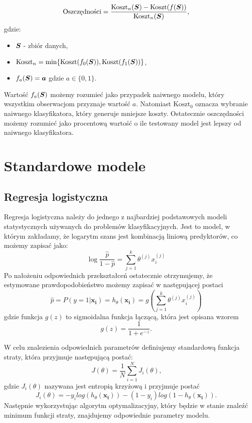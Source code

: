 \documentclass[inzynierska]{pwr_wmat_praca_dyplomowa}
\theoremstyle{plain}
\numberwithin{theorem}{chapter}
\theoremstyle{definition}
\numberwithin{theorem}{chapter}
\begin{document}
\begin{equation}
\text{Oszczędności} = \frac{\text{Koszt}_{n}(\boldsymbol{S}) - \text{Koszt}(f(\boldsymbol{S}))}{\text{Koszt}_{n}(\boldsymbol{S})} \text{,}
\end{equation}
gdzie:
\begin{itemize}
	\item $ \boldsymbol{S} $ - zbiór danych,
	\item $ \text{Koszt}_n = \min\{\text{Koszt}(f_{0}(\boldsymbol{S})), \text{Koszt}(f_{1}(\boldsymbol{S}))\} $,
	\item $ f_{a}(\boldsymbol{S}) = \boldsymbol{a} $ gdzie $a \in \{0,1\}$.
\end{itemize}{}
Wartość $ f_{a}(\boldsymbol{S})$ możemy rozumieć jako przypadek naiwnego modelu, który wszystkim obserwacjom przyznaje wartość $a$. Natomiast $ \text{Koszt}_0 $ oznacza wybranie naiwnego klasyfikatora, który generuje mniejsze koszty. Ostatecznie oszczędności możemy rozumieć jako procentową wartość o ile testowany model jest lepszy od naiwnego klasyfikatora.


\section{Standardowe modele}

\subsection{Regresja logistyczna}
\label{reg-log}
Regresja logistyczna należy do jednego z najbardziej podstawowych modeli statystycznych używanych do problemów klasyfikacyjnych. Jest to model, w którym zakładamy, że logarytm szans jest kombinacją liniową predyktorów, co możemy zapisać jako:
$$ \log{\frac{\hat{p}}{1 - \hat{p}}} = \sum_{j=1}^k \theta^{(j)}x_i^{(j)} $$
Po nałożeniu odpowiednich przekształceń ostatecznie otrzymujemy, że estymowane prawdopodobieństwo możemy zapisać w następującej postaci
\begin{equation}
	\hat{p} = P(y=1|\boldsymbol{x_i}) = h_{\theta}(\boldsymbol{x_i}) = g\left(\sum_{j=1}^k \theta^{(j)}x_i^{(j)} \right)
\end{equation} 
gdzie funkcja $g(z)$ to sigmoidalna funkcja łączącą, która jest opisana wzorem
$$ g(z) = \frac{1}{1+e^{-z}} \text{.}$$

W celu znalezienia odpowiednich parametrów definiujemy standardową funkcja straty, która przyjmuje następującą postać:
$$ J(\theta) = \frac{1}{N} \sum_{i=1}^N J_i(\theta) \text{,}$$
gdzie $J_i(\theta)$ nazywana jest entropią krzyżową i przyjmuje postać
\begin{equation}
	\label{c-e}
	J_i(\theta) = -y_i log(h_{\theta}(\boldsymbol{x_i})) - (1-y_i) log(1 - h_{\theta}(\boldsymbol{x_i})) \text{.}
\end{equation}
Następnie wykorzystując algorytm optymalizacyjny, który będzie w stanie znaleźć minimum funkcji straty, znajdujemy odpowiednie parametry modelu.
\end{document}
